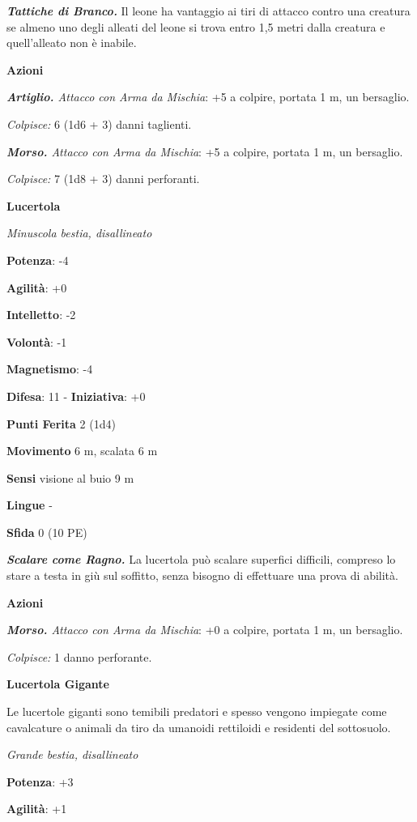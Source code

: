 \begin{multicols}{2}
\emph{\textbf{Tattiche di Branco.}} Il leone ha vantaggio ai tiri di
attacco contro una creatura se almeno uno degli alleati del leone si
trova entro 1,5 metri dalla creatura e quell'alleato non è inabile.

\smallskip\textbf{Azioni}

\emph{\textbf{Artiglio.} Attacco con Arma da Mischia}: +5 a colpire,
portata 1 m, un bersaglio.

\emph{Colpisce:} 6 (1d6 + 3) danni taglienti.

\emph{\textbf{Morso.} Attacco con Arma da Mischia}: +5 a colpire,
portata 1 m, un bersaglio.

\emph{Colpisce:} 7 (1d8 + 3) danni perforanti.

\textbf{Lucertola}

\emph{Minuscola bestia, disallineato}

\textbf{Potenza}: -4

\textbf{Agilità}: +0

\textbf{Intelletto}: -2

\textbf{Volontà}: -1

\textbf{Magnetismo}: -4

\textbf{Difesa}: 11 - \textbf{Iniziativa}: +0

\textbf{Punti Ferita} 2 (1d4)

\textbf{Movimento} 6 m, scalata 6 m

\textbf{Sensi} visione al buio 9 m

\textbf{Lingue} -

\textbf{Sfida} 0 (10 PE)\smallskip

\emph{\textbf{Scalare come Ragno.}} La lucertola può scalare superfici
difficili, compreso lo stare a testa in giù sul soffitto, senza bisogno
di effettuare una prova di abilità.

\smallskip\textbf{Azioni}

\emph{\textbf{Morso.} Attacco con Arma da Mischia}: +0 a colpire,
portata 1 m, un bersaglio.

\emph{Colpisce:} 1 danno perforante.

\textbf{Lucertola Gigante}

Le lucertole giganti sono temibili predatori e spesso vengono impiegate
come cavalcature o animali da tiro da umanoidi rettiloidi e residenti
del sottosuolo.

\emph{Grande bestia, disallineato}

\textbf{Potenza}: +3

\textbf{Agilità}: +1


\end{multicols}
